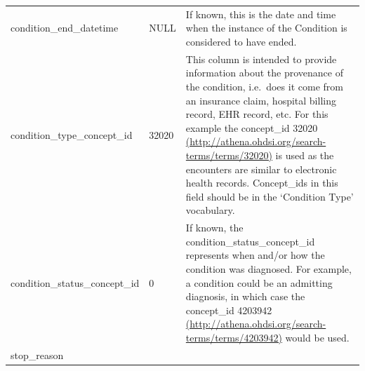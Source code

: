 \documentclass[]{book}
\begin{document}
\begin{longtable}[]{@{}lll@{}}
\begin{minipage}[t]{0.27\columnwidth}
condition\_end\_datetime\strut
\end{minipage} & \begin{minipage}[t]{0.14\columnwidth}\raggedright\strut
NULL\strut
\end{minipage} & \begin{minipage}[t]{0.50\columnwidth}\raggedright\strut
If known, this is the date and time when the instance of the Condition
is considered to have ended.\strut
\end{minipage}\tabularnewline
\begin{minipage}[t]{0.27\columnwidth}\raggedright\strut
condition\_type\_concept\_id\strut
\end{minipage} & \begin{minipage}[t]{0.14\columnwidth}\raggedright\strut
32020\strut
\end{minipage} & \begin{minipage}[t]{0.50\columnwidth}\raggedright\strut
This column is intended to provide information about the provenance of
the condition, i.e.~does it come from an insurance claim, hospital
billing record, EHR record, etc. For this example the concept\_id 32020
\href{http://athena.ohdsi.org/search-terms/terms/32020}{(http://athena.ohdsi.org/search-terms/terms/32020)}
is used as the encounters are similar to electronic health records.
Concept\_ids in this field should be in the `Condition Type'
vocabulary.\strut
\end{minipage}\tabularnewline
\begin{minipage}[t]{0.27\columnwidth}\raggedright\strut
condition\_status\_concept\_id\strut
\end{minipage} & \begin{minipage}[t]{0.14\columnwidth}\raggedright\strut
0\strut
\end{minipage} & \begin{minipage}[t]{0.50\columnwidth}\raggedright\strut
If known, the condition\_status\_concept\_id represents when and/or how
the condition was diagnosed. For example, a condition could be an
admitting diagnosis, in which case the concept\_id 4203942
\href{http://athena.ohdsi.org/search-terms/terms/4203942}{(http://athena.ohdsi.org/search-terms/terms/4203942)}
would be used.\strut
\end{minipage}\tabularnewline
\begin{minipage}[t]{0.27\columnwidth}\raggedright\strut
stop\_reason\strut
\end{minipage} & \begin{minipage}[t]{0.14\columnwidth}\raggedright\strut

\end{minipage}
\end{longtable}
\end{document}

